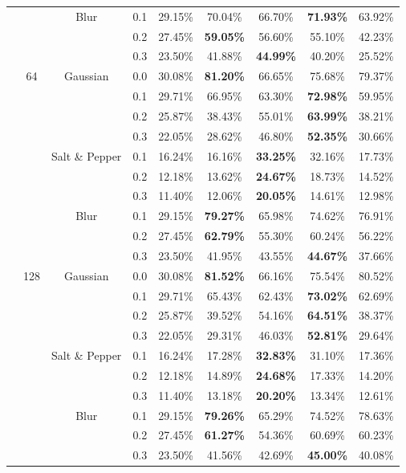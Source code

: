 \documentclass{article}
\begin{document}
\begin{table}[t]
\begin{center}
\begin{small}
\begin{tabular}{lcccccccc}
 &  & Blur & 0.1 & 29.15\% & 70.04\% & 66.70\% & \textbf{71.93\%} & 63.92\% \\
 &  &  & 0.2 & 27.45\% & \textbf{59.05\%} & 56.60\% & 55.10\% & 42.23\% \\
 &  &  & 0.3 & 23.50\% & 41.88\% & \textbf{44.99\%} & 40.20\% & 25.52\% \\
\midrule
 & 64 & Gaussian & 0.0 & 30.08\% & \textbf{81.20\%} & 66.65\% & 75.68\% & 79.37\% \\
 &  &  & 0.1 & 29.71\% & 66.95\% & 63.30\% & \textbf{72.98\%} & 59.95\% \\
 &  &  & 0.2 & 25.87\% & 38.43\% & 55.01\% & \textbf{63.99\%} & 38.21\% \\
 &  &  & 0.3 & 22.05\% & 28.62\% & 46.80\% & \textbf{52.35\%} & 30.66\% \\
 &  & Salt \& Pepper & 0.1 & 16.24\% & 16.16\% & \textbf{33.25\%} & 32.16\% & 17.73\% \\
 &  &  & 0.2 & 12.18\% & 13.62\% & \textbf{24.67\%} & 18.73\% & 14.52\% \\
 &  &  & 0.3 & 11.40\% & 12.06\% & \textbf{20.05\%} & 14.61\% & 12.98\% \\
 &  & Blur & 0.1 & 29.15\% & \textbf{79.27\%} & 65.98\% & 74.62\% & 76.91\% \\
 &  &  & 0.2 & 27.45\% & \textbf{62.79\%} & 55.30\% & 60.24\% & 56.22\% \\
 &  &  & 0.3 & 23.50\% & 41.95\% & 43.55\% & \textbf{44.67\%} & 37.66\% \\
\midrule
 & 128 & Gaussian & 0.0 & 30.08\% & \textbf{81.52\%} & 66.16\% & 75.54\% & 80.52\% \\
 &  &  & 0.1 & 29.71\% & 65.43\% & 62.43\% & \textbf{73.02\%} & 62.69\% \\
 &  &  & 0.2 & 25.87\% & 39.52\% & 54.16\% & \textbf{64.51\%} & 38.37\% \\
 &  &  & 0.3 & 22.05\% & 29.31\% & 46.03\% & \textbf{52.81\%} & 29.64\% \\
 &  & Salt \& Pepper & 0.1 & 16.24\% & 17.28\% & \textbf{32.83\%} & 31.10\% & 17.36\% \\
 &  &  & 0.2 & 12.18\% & 14.89\% & \textbf{24.68\%} & 17.33\% & 14.20\% \\
 &  &  & 0.3 & 11.40\% & 13.18\% & \textbf{20.20\%} & 13.34\% & 12.61\% \\
 &  & Blur & 0.1 & 29.15\% & \textbf{79.26\%} & 65.29\% & 74.52\% & 78.63\% \\
 &  &  & 0.2 & 27.45\% & \textbf{61.27\%} & 54.36\% & 60.69\% & 60.23\% \\
 &  &  & 0.3 & 23.50\% & 41.56\% & 42.69\% & \textbf{45.00\%} & 40.08\% \\
\bottomrule
\end{tabular}
\end{small}
\end{center}
\end{table}
\end{document}
